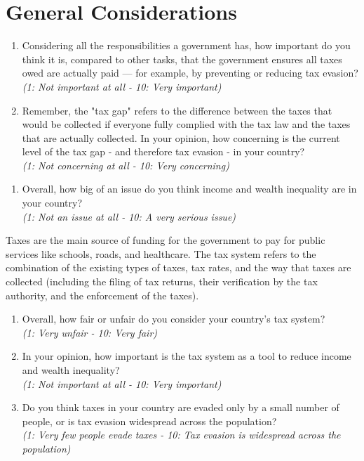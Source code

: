\documentclass[11pt]{article}
\begin{document}
\section*{General Considerations}
\begin{enumerate}[resume]
    \item Considering all the responsibilities a government has, how important do you think it is, compared to other tasks, that the government ensures all taxes owed are actually paid — for example, by preventing or reducing tax evasion?\\
    \textit{(1: Not important at all  - 10: Very important)}
    \item Remember, the "tax gap" refers to the difference between the taxes that would be collected if everyone fully complied with the tax law and the taxes that are actually collected. In your opinion, how concerning is the current level of the tax gap - and therefore tax evasion - in your country?\\
    \textit{(1: Not concerning at all - 10: Very concerning)}
\end{enumerate}
\begin{enumerate}[resume]
    \item Overall, how big of an issue do you think income and wealth inequality are in your country?\\
    \textit{(1: Not an issue at all - 10: A very serious issue)}
\end{enumerate}
Taxes are the main source of funding for the government to pay for public services like schools, roads, and healthcare. The tax system refers to the combination of the existing types of taxes, tax rates, and the way that taxes are collected (including the filing of tax returns, their verification by the tax authority, and the enforcement of the taxes). 
\begin{enumerate}[resume]
    \item Overall, how fair or unfair do you consider your country’s tax system?\\
    \textit{(1: Very unfair - 10: Very fair)}
    \item In your opinion, how important is the tax system as a tool to reduce income and wealth inequality?\\
    \textit{(1: Not important at all - 10: Very important)}
    \item Do you think taxes in your country are evaded only by a small number of people, or is tax evasion widespread across the population?  \\
    \textit{(1: Very few people evade taxes - 10: Tax evasion is widespread across the population)}
\end{enumerate}
\end{document}
